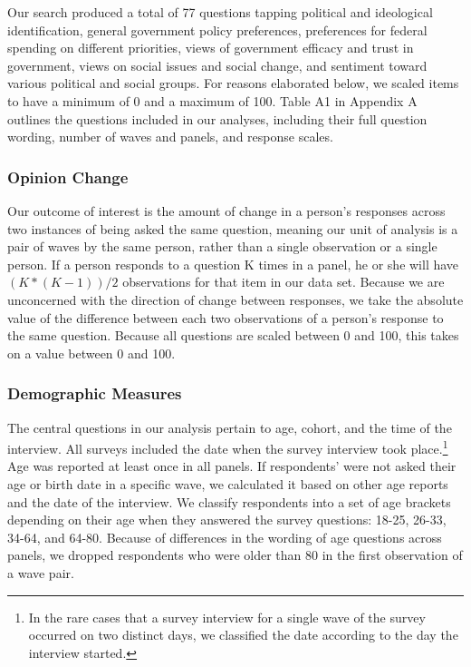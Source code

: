 \documentclass[
  12pt,
]{article}
\begin{document}
Our search produced a total of 77 questions tapping political and ideological identification, general government policy preferences, preferences for federal spending on different priorities, views of government efficacy and trust in government, views on social issues and social change, and sentiment toward various political and social groups. For reasons elaborated below, we scaled items to have a minimum of 0 and a maximum of 100. Table A1 in Appendix A outlines the questions included in our analyses, including their full question wording, number of waves and panels, and response scales.

\hypertarget{opinion-change}{%
\subsubsection{Opinion Change}\label{opinion-change}}

Our outcome of interest is the amount of change in a person's responses across two instances of being asked the same question, meaning our unit of analysis is a pair of waves by the same person, rather than a single observation or a single person. If a person responds to a question K times in a panel, he or she will have \((K*(K-1))/2\) observations for that item in our data set. Because we are unconcerned with the direction of change between responses, we take the absolute value of the difference between each two observations of a person's response to the same question. Because all questions are scaled between 0 and 100, this takes on a value between 0 and 100.

\hypertarget{demographic-measures}{%
\subsubsection{Demographic Measures}\label{demographic-measures}}

The central questions in our analysis pertain to age, cohort, and the time of the interview. All surveys included the date when the survey interview took place.\footnote{In the rare cases that a survey interview for a single wave of the survey occurred on two distinct days, we classified the date according to the day the interview started.} Age was reported at least once in all panels. If respondents' were not asked their age or birth date in a specific wave, we calculated it based on other age reports and the date of the interview. We classify respondents into a set of age brackets depending on their age when they answered the survey questions: 18-25, 26-33, 34-64, and 64-80. Because of differences in the wording of age questions across panels, we dropped respondents who were older than 80 in the first observation of a wave pair.
\end{document}
